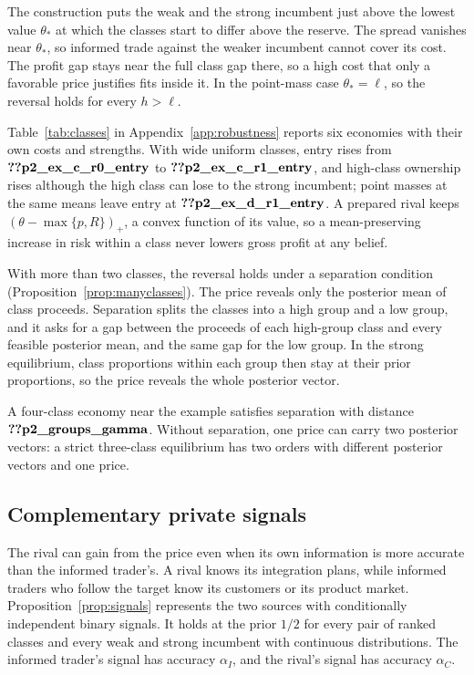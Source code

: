 The construction puts the weak and the strong incumbent
just above the lowest value \(\theta_*\) at which the classes start to differ above the reserve. The spread vanishes near
\(\theta_*\), so informed trade against the weaker incumbent cannot cover its cost. The profit gap stays near the full class
gap there, so a high cost that only a favorable price justifies fits inside it. In the point-mass case
\(\theta_*=\ell\), so the reversal holds for every \(h>\ell\).

Table~\ref{tab:classes} in Appendix~\ref{app:robustness} reports six economies with their own costs and
strengths. With wide uniform classes, entry rises from \(\reg{p2_ex_c_r0_entry}\) to
\(\reg{p2_ex_c_r1_entry}\), and high-class ownership rises although the high class can lose to the strong
incumbent; point masses at the same means leave entry at \(\reg{p2_ex_d_r1_entry}\). A prepared rival keeps
\((\theta-\max\{p,R\})_+\), a convex function of its value, so a mean-preserving increase in risk within a class never
lowers gross profit at any belief.

With more than two classes, the reversal holds under a separation condition (Proposition~\ref{prop:manyclasses}).
The price reveals only the posterior mean of class proceeds. Separation splits the classes into a high group
and a low group, and it asks for a gap between the proceeds of each high-group class and every feasible
posterior mean, and the same gap for the low group. In the
strong equilibrium, class proportions within each group then stay at their prior proportions, so the price reveals
the whole posterior vector.

A four-class economy near the example satisfies separation with distance \(\reg{p2_groups_gamma}\).
Without separation, one price can carry two posterior vectors: a strict three-class
equilibrium has two orders with different posterior vectors and one price.

\subsection{Complementary private signals}\label{sec:signals}

The rival can gain from the price even when its own information is more accurate than the informed trader's. A rival
knows its integration plans, while informed traders who follow the target know its customers or its product market.
Proposition~\ref{prop:signals} represents the two sources with conditionally independent binary
signals. It holds at the prior \(1/2\) for every pair of ranked classes and every weak and strong incumbent
with continuous distributions. The informed trader's signal has accuracy \(\alpha_I\), and the rival's signal has accuracy \(\alpha_C\).

